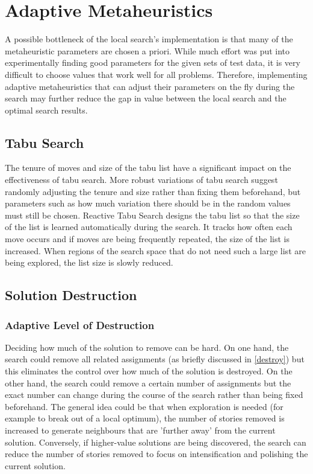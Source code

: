 \section{Adaptive Metaheuristics}

A possible bottleneck of the local search's implementation is that many of the metaheuristic parameters are chosen a priori. While much effort was put into experimentally finding good parameters for the given sets of test data, it is very difficult to choose values that work well for all problems. Therefore, implementing adaptive metaheuristics that can adjust their parameters on the fly during the search may further reduce the gap in value between the local search and the optimal search results.

\subsection{Tabu Search}
The tenure of moves and size of the tabu list have a significant impact on the effectiveness of tabu search. More robust variations of tabu search suggest randomly adjusting the tenure and size rather than fixing them beforehand, but parameters such as how much variation there should be in the random values must still be chosen. Reactive Tabu Search \citep{battiti1994reactive} designs the tabu list so that the size of the list is learned automatically during the search. It tracks how often each move occurs and if moves are being frequently repeated, the size of the list is increased. When regions of the search space that do not need such a large list are being explored, the list size is slowly reduced.

\subsection{Solution Destruction}

\subsubsection{Adaptive Level of Destruction}
Deciding how much of the solution to remove can be hard. On one hand, the search could remove all related assignments (as briefly discussed in \cref{destroy}) but this eliminates the control over how much of the solution is destroyed. On the other hand, the search could remove a certain number of assignments but the exact number can change during the course of the search rather than being fixed beforehand. The general idea could be that when exploration is needed (for example to break out of a local optimum), the number of stories removed is increased to generate neighbours that are 'further away' from the current solution. Conversely, if higher-value solutions are being discovered, the search can reduce the number of stories removed to focus on intensification and polishing the current solution.


